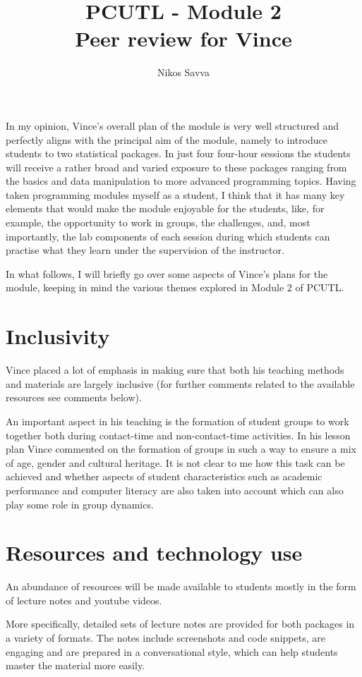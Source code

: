 \documentclass[12pt,a4paper]{article}
\title{PCUTL - Module 2\\Peer review for Vince}
\author{Nikos Savva}
\date{}
\begin{document}
\maketitle

In my opinion, Vince's overall plan of the module is very well structured and perfectly aligns with the principal aim of the module, namely to introduce students to two statistical packages. In just four four-hour sessions the students will receive a rather broad and varied exposure to these packages ranging from the basics and data manipulation to more advanced programming topics. Having taken programming modules myself as a student, I think that it has many key elements that would make the module enjoyable for the students, like, for example, the opportunity to work in groups, the challenges, and, most importantly, the lab components of each session during which students can practise what they learn under the supervision of the instructor.

In what follows, I will briefly go over some aspects of Vince's plans for the module, keeping in mind the various themes explored in Module 2 of PCUTL.

\section{Inclusivity}

Vince placed a lot of emphasis in making sure that both his teaching methods and materials are largely inclusive (for further comments related to the available resources see comments below).

An important aspect in his teaching is the formation of student groups to work together both during contact-time and non-contact-time activities. In his lesson plan Vince commented on the formation of groups in such a way to ensure a mix of age, gender and cultural heritage. It is not clear to me how this task can be achieved and whether aspects of student characteristics such as academic performance and computer literacy are also taken into account which can also play some role in group dynamics.

\section{Resources and technology use}

An abundance of resources will be made available to students mostly in the form of lecture notes and youtube videos.

More specifically, detailed sets of lecture notes are provided for both packages in a variety of formats. The notes include screenshots and code snippets, are engaging and are prepared in a conversational style, which can help students master the material more easily.
\end{document}
